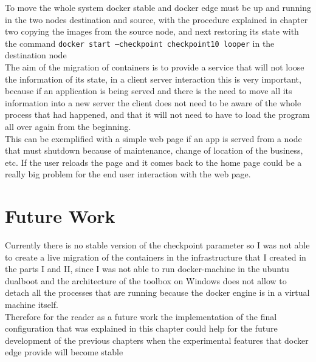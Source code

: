To move the whole system  docker stable and docker edge must be up and running in the two nodes destination and source, with the procedure explained in chapter two copying the images from the source node, and next restoring its state with the command \texttt{docker start --checkpoint checkpoint10 looper} in the destination node\\

The aim of the migration of containers is to provide a service that will not loose the information of its state, in a client server interaction this is very important, because if an application is being served and there is the need to move all its information into a new server the client does not need to be aware of the whole process that had happened, and that it will not need to have to load the program all over again from the beginning.\\

This can be exemplified with a simple web page if an app is served from a node that must shutdown because of maintenance, change of location of the business, etc. If the user reloads the page and it comes back to the home page could be a really big problem for the end user interaction with the web page.

\section{Future Work}

Currently there is no stable version of the checkpoint parameter so I was not able to create a live migration of the containers in the infrastructure that I created in the parts I and II, since I was not able to run docker-machine in the ubuntu dualboot and the architecture of the toolbox on Windows does not allow to detach all the processes that are running because the docker engine is in a virtual machine itself. \\

Therefore for the reader as a future work the implementation of the final configuration that was explained in this chapter could help for the future development of the previous chapters when the experimental features that docker edge provide will become stable 